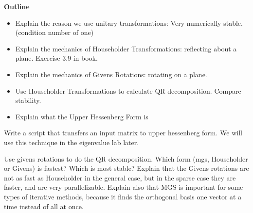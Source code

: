 

{\bf Outline}
\begin{itemize}
\item Explain the reason we use unitary transformations: Very numerically stable. (condition number of one)
\item Explain the mechanics of Householder Transformations: reflecting about a plane. Exercise 3.9 in book.
\item Explain the mechanics of Givens Rotations: rotating on a plane.
\item Use Householder Transformations to calculate QR decomposition. Compare stability.
\item Explain what the Upper Hessenberg Form is
\end{itemize}

\begin{problem}
Write a script that transfers an input matrix to upper hessenberg form. We will use this technique in the eigenvalue lab later.
\end{problem}

\begin{problem}
Use givens rotations to do the QR decomposition. Which form (mgs, Householder or Givens) is fastest? Which is most stable? Explain that the Givens rotations are not as fast as Householder in the general case, but in the sparse case they are faster, and are very parallelizable. Explain also that MGS is important for some types of iterative methods, because it finds the orthogonal basis one vector at a time instead of all at once.
\end{problem}



